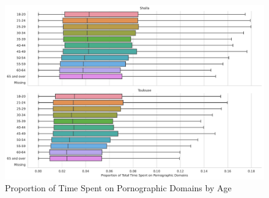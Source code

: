 \documentclass[12pt, letterpaper]{article}
\begin{document}
\begin{figure}[!htb]
	\centering
	\caption{Proportion of Time Spent on Pornographic Domains by Age}
	\label{fig:prop_time_porn_age}
	\includegraphics[width=\textwidth]{../figs/prop_total_time_porn_age.pdf}
\end{figure}
\end{document}
